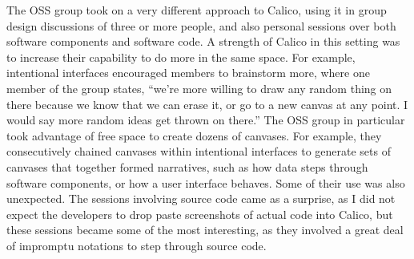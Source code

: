 \documentclass[12pt,fleqn]{ucithesis}
\begin{document}
The OSS group took on a very different approach to Calico, using it in group design discussions of three or more people, and also personal sessions over both software components and software code. A strength of Calico in this setting was to increase their capability to do more in the same space. For example, intentional interfaces encouraged members to brainstorm more, where one member of the group states, ``we're more willing to draw any random thing on there because we know that we can erase it, or go to a new canvas at any point. I would say more random ideas get thrown on there.'' The OSS group in particular took advantage of free space to create dozens of canvases. For example, they consecutively chained canvases within intentional interfaces to generate sets of canvases that together formed narratives, such as how data steps through software components, or how a user interface behaves. Some of their use was also unexpected. The sessions involving source code came as a surprise, as I did not expect the developers to drop paste screenshots of actual code into Calico, but these sessions became some of the most interesting, as they involved a great deal of impromptu notations to step through source code.

\end{document}
